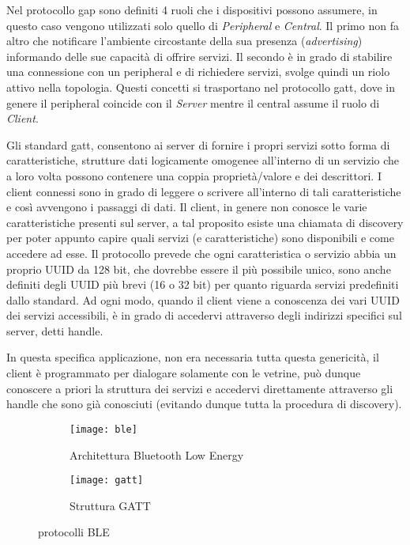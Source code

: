 Nel protocollo gap sono definiti 4 ruoli che i dispositivi possono assumere, in questo caso vengono utilizzati solo quello di \textit{Peripheral} e \textit{Central}. Il primo non fa altro che notificare l'ambiente circostante della sua presenza (\textit{advertising}) informando delle sue capacit\`a di offrire servizi. Il secondo \`e in grado di stabilire una connessione con un peripheral e di richiedere servizi, svolge quindi un riolo attivo nella topologia. Questi concetti si trasportano nel protocollo gatt, dove in genere il peripheral coincide con il \textit{Server} mentre il central assume il ruolo di \textit{Client}.

Gli standard gatt, consentono ai server di fornire i propri servizi sotto forma di caratteristiche, strutture dati logicamente omogenee all'interno di un servizio che a loro volta possono contenere una coppia propriet\`a/valore e dei descrittori. I client connessi sono in grado di leggere o scrivere all'interno di tali caratteristiche e cos\`i avvengono i passaggi di dati. Il client, in genere non conosce le varie caratteristiche presenti sul server, a tal proposito esiste una chiamata di discovery per poter appunto capire quali servizi (e caratteristiche) sono disponibili e come accedere ad esse. Il protocollo prevede che ogni caratteristica o servizio abbia un proprio UUID da 128 bit, che dovrebbe essere il pi\`u possibile unico, sono anche definiti degli UUID pi\`u brevi (16 o 32 bit) per quanto riguarda servizi predefiniti dallo standard. Ad ogni modo, quando il client viene a conoscenza dei vari UUID dei servizi accessibili, \`e in grado di accedervi attraverso degli indirizzi specifici sul server, detti handle.

In questa specifica applicazione, non era necessaria tutta questa genericit\`a, il client \`e programmato per dialogare solamente con le vetrine, pu\`o dunque conoscere a priori la struttura dei servizi e accedervi direttamente attraverso gli handle che sono gi\`a conosciuti (evitando dunque tutta la procedura di discovery).

\begin{figure}[ht]
  \center
  \begin{subfigure}{.65\textwidth}
    \texttt{[image: ble]}
    \caption{Architettura Bluetooth Low Energy}
  \end{subfigure}
  \hfill
  \begin{subfigure}{.25\textwidth}
    \texttt{[image: gatt]}
    \caption{Struttura GATT}
  \end{subfigure}
  \caption{protocolli BLE}
\end{figure}

